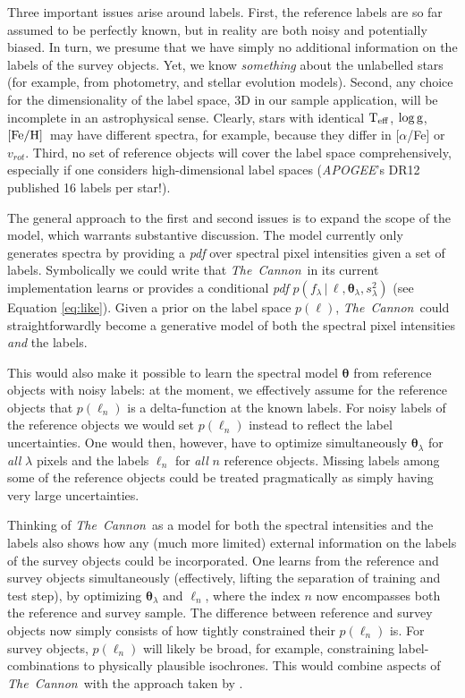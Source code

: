 \documentclass[12pt, preprint]{aastex}
\newcommand{\tc}{\textsl{The~Cannon}}
\newcommand{\apogee}{\textsl{APOGEE}}
\newcommand{\set}[1]{\bm{#1}}
\newcommand{\starlabel}{\ell}
\newcommand{\starlabelvec}{\set{\starlabel}}
\newcommand{\given}{\,|\,}
\newcommand{\teff}{\mbox{$\rm T_{eff}$}}
\newcommand{\feh}{\mbox{$\rm [Fe/H]$}}
\newcommand{\logg}{\mbox{$\rm \log g$}}
\begin{document}
Three important issues arise around labels. First, the reference labels are so far assumed to be perfectly known, 
but in reality are both noisy and potentially biased. In turn, we presume that we
have simply no additional information on the labels of the survey objects. Yet,
we know \emph{something} about the unlabelled stars (for example, from
photometry, and stellar evolution models). Second, any choice for the dimensionality of the label space, 3D in our sample application, will be incomplete in an astrophysical sense. Clearly, stars with identical \teff, \logg, \feh\ may have different spectra, for example,
because they differ in [$\alpha$/Fe] or $v_{rot}$.
Third, no set of reference objects will cover the label
space comprehensively, especially if one considers high-dimensional label spaces (\apogee 's DR12
published 16 labels per star!). 

The general approach to the first and second issues is to expand the scope of the model, which warrants substantive discussion. The model currently only generates spectra by providing a \textit{pdf}
over spectral pixel intensities given a set of labels.
Symbolically we could write that \tc\ in its current implementation
learns or provides a conditional \textit{pdf}
$p(f_\lambda\given\starlabelvec,\set{\theta}_\lambda, s_\lambda^2)$ (see Equation \ref{eq:like}).
Given a prior on the label space
$p(\starlabelvec)$, \tc\ could straightforwardly become a generative model of both
the spectral pixel intensities \emph{and} the labels.

This would also make it possible to learn the spectral model $\set{\theta}$ from
reference objects with noisy labels: at the moment, we effectively 
assume for the reference objects that $p(\starlabelvec_n)$ is a delta-function 
at the known labels. For noisy labels of the reference objects 
we would set $p(\starlabelvec_n)$ instead to reflect the label uncertainties. 
One would then, however, have to optimize simultaneously
$\set{\theta}_\lambda$ for \textit{all} $\lambda$ pixels and the labels $\starlabelvec_n$
for \textit{all} $n$ reference objects. Missing labels among some of the reference
objects could be treated pragmatically as simply having very large uncertainties.

Thinking of \tc\ as a model for both the spectral intensities and the labels
also shows how any (much more limited) external information on the labels of the survey
objects could be incorporated. One learns from the reference and survey objects
simultaneously (effectively, lifting the separation of training and test step),
by optimizing $\set{\theta}_\lambda$ and $\starlabelvec_n$, where the index $n$ now 
encompasses both the reference and survey sample. The difference between reference and survey objects
now simply consists of how tightly constrained their $p(\starlabelvec_n)$ is. 
For survey objects, $p(\starlabelvec_n)$ will likely be broad, for example, constraining label-combinations
to physically plausible isochrones. This would combine aspects of \tc\ with the approach
taken by \cite{SB2014}.
\end{document}
